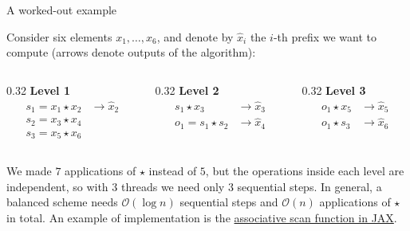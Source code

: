 \documentclass[11pt,aspectratio=169]{beamer}
\begin{document}
\begin{frame}{A worked-out example}
    \setlength{\parskip}{6pt}

    Consider six elements $x_1,\ldots,x_6$, and denote by $\hat{x}_i$ the
    $i$-th prefix we want to compute (arrows denote outputs of the algorithm):

    \begin{columns}[T,onlytextwidth]
        \begin{column}{0.32\textwidth}
            \centering\textbf{Level 1}
            \begin{align*}
                s_1=x_1\star x_2 & \rightarrow\hat{x}_2 \\
                s_2=x_3\star x_4 &                      \\
                s_3=x_5\star x_6 &
            \end{align*}
        \end{column}
        \begin{column}{0.32\textwidth}
            \centering\textbf{Level 2}
            \begin{align*}
                s_1\star x_3     & \rightarrow\hat{x}_3 \\
                o_1=s_1\star s_2 & \rightarrow\hat{x}_4
            \end{align*}
        \end{column}
        \begin{column}{0.32\textwidth}
            \centering\textbf{Level 3}
            \begin{align*}
                o_1\star x_5 & \rightarrow\hat{x}_5 \\
                o_1\star s_3 & \rightarrow\hat{x}_6
            \end{align*}
        \end{column}
    \end{columns}

    \medskip
    We made $7$ applications of $\star$ instead of $5$, but the operations
    inside each level are independent, so with $3$ threads we need only $3$
    sequential steps. In general, a balanced scheme needs
    $\mathcal{O}(\log n)$ sequential steps and $\mathcal{O}(n)$ applications
    of $\star$ in total. An example of implementation is the
    \href{https://jax.readthedocs.io/en/latest/_autosummary/jax.lax.associative_scan.html}{associative scan function in JAX}.


\end{frame}
\end{document}
